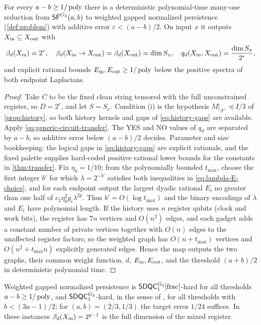 \begin{theorem}
\label{thm:general-hardness}
For every \(a-b\ge1/\operatorname{poly}\) there is a deterministic polynomial-time many-one
reduction from \(\mathsf{SF}^{G_2}(a,b)\) to weighted gapped normalized persistence
(\cref{def:problem}) with additive error \(\varepsilon<(a-b)/2\).  On input
\(x\) it outputs \(X_{\mathrm{in}}\subseteq X_{\mathrm{out}}\) with
\[
\beta_d(X_{\mathrm{in}})=2^{r},\quad
\beta_d(X_{\mathrm{in}}\to X_{\mathrm{out}})=\beta_d(X_{\mathrm{out}})=\dim S_x,\quad
q_d(X_{\mathrm{in}},X_{\mathrm{out}})=\frac{\dim S_x}{2^{r}},
\]
and explicit rational bounds \(E_{\rm in},E_{\rm out}\ge1/\operatorname{poly}\) below the
positive spectra of both endpoint Laplacians.
\end{theorem}

\begin{proof}
Take \(C\) to be the fixed clean string tensored with the full unconstrained
register, so \(D=2^{r}\), and let \(S=S_x\).  Condition (i) is the hypothesis
\(M|_{S^\perp}\preceq I/3\) of \cref{prop:history}, so both history kernels
and gaps of \cref{eq:history-gaps} are available.  Apply
\cref{eq:generic-circuit-transfer}.  The YES and NO values of \(q_d\) are
separated by \(a-b\), so additive error below \((a-b)/2\) decides.  Parameter
and size bookkeeping: the logical gaps in \cref{eq:history-gaps} are explicit
rationals, and the fixed palette supplies hard-coded positive rational lower
bounds for the constants in \cref{thm:transfer}.  Fix \(\eta_0=1/10\); from
the polynomially bounded \(t_{\max}\), choose the first integer \(b'\) for
which \(\lambda=2^{-b'}\) satisfies both inequalities in
\cref{eq:lambda-E-choice}, and for each endpoint output the largest dyadic
rational \(E_i\) no greater than one half of \(c_2\eta_0^2g_i\lambda^{2p}\).
Thus \(b'=O(\log t_{\max})\) and the binary encodings of \(\lambda\) and
\(E_i\) have polynomial length.  If the history uses \(n\) register qubits
(clock and work bits), the register has \(7n\) vertices and \(O(n^2)\)
edges, and each gadget adds a constant number of private vertices together
with \(O(n)\) edges to the unaffected register factors; so the weighted
graph has \(O(n+t_{\max})\) vertices and \(O(n^2+t_{\max}n)\) explicitly
generated edges.  Hence the map outputs the two graphs, their common weight
function, \(d\), \(E_{\rm in},E_{\rm out}\), and the threshold
\((a+b)/2\) in deterministic polynomial time.
\end{proof}

\begin{corollary}
\label{cor:sdqc}
Weighted gapped normalized persistence is \(\mathsf{SDQC}_{1}^{G_2}[\mathrm{frac}]\)-hard
for all thresholds \(a-b\ge1/\operatorname{poly}\), and \(\mathsf{SDQC}_{1}^{G_2}\)-hard, in the
sense of \cite[Definition~2]{lowe2026normalized}, for all thresholds with
\(b<(3a-1)/2\); for \((a,b)=(2/3,1/3)\) the target error \(1/24\) suffices.
In these instances \(\beta_d(X_{\mathrm{in}})=2^{q-1}\) is the full dimension of the
mixed register.
\end{corollary}

